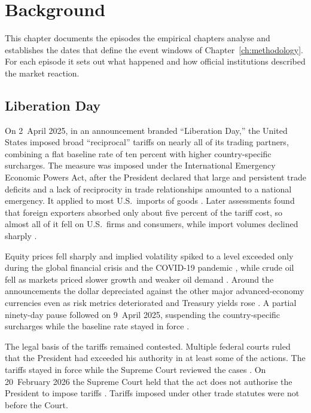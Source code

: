 
\chapter{Background}
\label{ch:background}

This chapter documents the episodes the empirical chapters analyse and establishes the dates that define the event windows of Chapter~\ref{ch:methodology}. For each episode it sets out what happened and how official institutions described the market reaction.

\section{Liberation Day}
\label{sec:bg_tariff}

On 2~April 2025, in an announcement branded ``Liberation Day,'' the United States imposed broad ``reciprocal'' tariffs on nearly all of its trading partners, combining a flat baseline rate of ten percent with higher country-specific surcharges. The measure was imposed under the International Emergency Economic Powers Act, after the President declared that large and persistent trade deficits and a lack of reciprocity in trade relationships amounted to a national emergency. It applied to most U.S.\ imports of goods \parencite{crs_2025_tariff_timeline}. Later assessments found that foreign exporters absorbed only about five percent of the tariff cost, so almost all of it fell on U.S.\ firms and consumers, while import volumes declined sharply \parencite{ecb_2026_bulletin}.

Equity prices fell sharply and implied volatility spiked to a level exceeded only during the global financial crisis and the COVID-19 pandemic \parencite{ecb_2025_fsr}, while crude oil fell as markets priced slower growth and weaker oil demand \parencite{eia_2026_crude}. Around the announcements the dollar depreciated against the other major advanced-economy currencies even as risk metrics deteriorated and Treasury yields rose \parencite{kamin_2025}. A partial ninety-day pause followed on 9~April 2025, suspending the country-specific surcharges while the baseline rate stayed in force \parencite{crs_2025_tariff_timeline}.

The legal basis of the tariffs remained contested. Multiple federal courts ruled that the President had exceeded his authority in at least some of the actions. The tariffs stayed in force while the Supreme Court reviewed the cases \parencite{crs_2025_tariff_timeline}. On 20~February 2026 the Supreme Court held that the act does not authorise the President to impose tariffs \parencite{scotus_2026_tariffs}. Tariffs imposed under other trade statutes were not before the Court.

